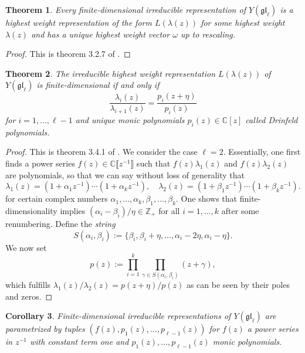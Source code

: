 \documentclass[11pt]{report}
\newtheorem{theorem}{Theorem}[section]
\newtheorem{corollary}[theorem]{Corollary}
\theoremstyle{definition}
\theoremstyle{remark}
\theoremstyle{remark}
\newcommand{\Z}{\mathbb{Z}}
\newcommand{\C}{\mathbb{C}}
\begin{document}
\begin{theorem}
Every finite-dimensional irreducible representation of $Y(\mathfrak{gl}_\ell)$ is a highest weight representation of the form $L(\lambda(z))$ for some highest weight $\lambda(z)$ and has a unique highest weight vector $\omega$ up to rescaling.
\end{theorem}

\begin{proof}
This is theorem 3.2.7 of \cite{book:molev}.
\end{proof}

\begin{theorem}
The irreducible highest weight representation $L(\lambda(z))$ of $Y(\mathfrak{gl}_\ell)$ is finite-dimensional if and only if
\begin{equation*}
\frac{\lambda_i(z)}{\lambda_{i+1}(z)} = \frac{p_i(z+\eta)}{p_i(z)}
\end{equation*}
for $i=1,...,\ell-1$ and unique monic polynomials $p_i(z) \in \C[z]$ called \emph{Drinfeld polynomials}.
\end{theorem}

\begin{proof}
This is theorem 3.4.1 of \cite{book:molev}. We consider the case $\ell = 2$. Essentially, one first finds a power series $f(z) \in \C\llbracket z^{-1} \rrbracket$ such that $f(z) \lambda_1(z)$ and $f(z) \lambda_2(z)$ are polynomials, so that we can say without loss of generality that
\begin{equation*}
\lambda_1(z) = (1+\alpha_1 z^{-1}) \cdots (1+\alpha_k z^{-1}), \quad \lambda_2(z) = (1+\beta_1 z^{-1}) \cdots (1+\beta_k z^{-1}).
\end{equation*}
for certain complex numbers $\alpha_1,...,\alpha_k,\beta_1,...,\beta_k$. One shows that finite-dimensionality implies $(\alpha_i - \beta_i)/\eta \in \Z_+$ for all $i=1,...,k$ after some renumbering. Define the \emph{string}
\begin{equation*}
S(\alpha_i,\beta_i) := \{ \beta_i, \beta_i+\eta, ..., \alpha_i-2\eta, \alpha_i-\eta \}.
\end{equation*}
We now set
\begin{equation*}
p(z) := \prod_{i=1}^k \prod_{\gamma \in S(\alpha_i,\beta_i)} (z + \gamma),
\end{equation*}
which fulfills $\lambda_1(z) / \lambda_2(z) = p(z+\eta) / p(z)$ as can be seen by their poles and zeros.
\end{proof}

\begin{corollary}
Finite-dimensional irreducible representations of $Y(\mathfrak{gl}_\ell)$ are parametrized by tuples $(f(z),p_1(z),...,p_{\ell-1}(z))$ for $f(z)$ a power series in $z^{-1}$ with constant term one and $p_1(z),...,p_{\ell-1}(z)$ monic polynomials.
\end{corollary}
\end{document}
